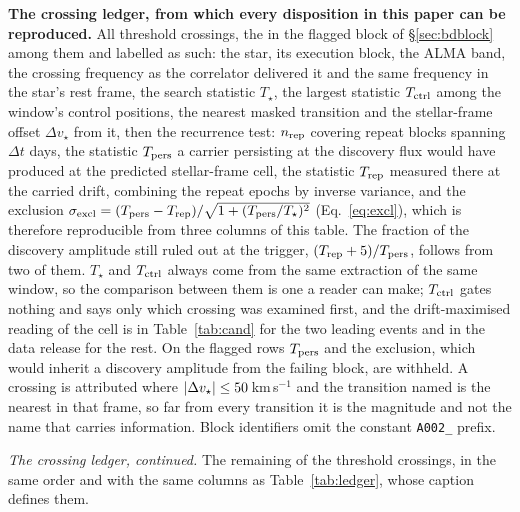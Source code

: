 \begin{table}
\centering
\caption{\textbf{The crossing ledger, from which every disposition in this
paper can be reproduced.} All \EvNCrossRaw{} threshold crossings, the
\EvNCrossFlag{} in the flagged block of \S\ref{sec:bdblock} among them and
labelled as such: the star, its execution block, the ALMA band, the crossing
frequency as the correlator delivered it and the same frequency in the star's
rest frame, the search statistic $T_\star$, the largest statistic
$T_{\rm ctrl}$ among the window's \NCtrl{} control positions, the nearest
masked transition and the stellar-frame offset $\Delta v_\star$ from it, then
the recurrence test: $n_{\rm rep}$ covering repeat blocks spanning $\Delta t$
days, the statistic $T_{\rm pers}$ a carrier persisting at the discovery flux
would have produced at the predicted stellar-frame cell, the statistic
$T_{\rm rep}$ measured there at the carried drift, combining the repeat
epochs by inverse variance, and the exclusion
$\sigma_{\rm excl}=(T_{\rm pers}-T_{\rm rep})/\sqrt{1+(T_{\rm pers}/T_\star)^2}$
(Eq.~\ref{eq:excl}), which is therefore reproducible from three columns of
this table. The fraction of the discovery amplitude still ruled out at the
trigger, $(T_{\rm rep}+5)/T_{\rm pers}$, follows from two of them.
$T_\star$ and $T_{\rm ctrl}$ always come from the same extraction of the same
window, so the comparison between them is one a reader can make;
$T_{\rm ctrl}$ gates nothing and says only which crossing was examined
first, and the drift-maximised reading of the cell is in
Table~\ref{tab:cand} for the two leading events and in the data release for
the rest. On the flagged rows $T_{\rm pers}$ and the exclusion, which would
inherit a discovery amplitude from the failing block, are withheld. A
crossing is attributed where
$|\Delta v_\star|\le\MaskHalfKms$\,km\,s$^{-1}$ and the transition named is
the nearest in that frame, so far from every transition it is the magnitude
and not the name that carries information. Block identifiers omit the
constant \texttt{A002\_} prefix.}
\label{tab:ledger}
\tiny

\end{table}

\begin{table}
\centering
\caption{\emph{The crossing ledger, continued.} The remaining
\CxLedgerPartTwo{} of the \EvNCrossRaw{} threshold crossings, in the same
order and with the same columns as Table~\ref{tab:ledger}, whose caption
defines them.}
\label{tab:ledgercont}
\tiny

\end{table}
